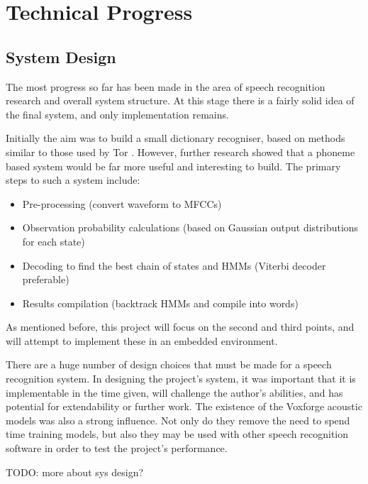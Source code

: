 \chapter{Technical Progress} %
\label{cha:technical_progress}


\section{System Design} %
\label{sec:system_design}
The most progress so far has been made in the area of speech recognition research and overall system structure.  At this stage there is a fairly solid idea of the final system, and only implementation remains.

Initially the aim was to build a small dictionary recogniser, based on methods similar to those used by Tor \cite{tor2003}.  However, further research showed that a phoneme based system would be far more useful and interesting to build.  The primary steps to such a system include:
\begin{itemize}
	\item Pre-processing (convert waveform to MFCCs)
	\item Observation probability calculations (based on Gaussian output distributions for each state)
	\item Decoding to find the best chain of states and HMMs (Viterbi decoder preferable)
	\item Results compilation (backtrack HMMs and compile into words)
\end{itemize}

As mentioned before, this project will focus on the second and third points, and will attempt to implement these in an embedded environment.

There are a huge number of design choices that must be made for a speech recognition system.  In designing the project's system, it was important that it is implementable in the time given, will challenge the author's abilities, and has potential for extendability or further work.  The existence of the Voxforge acoustic models was also a strong influence.  Not only do they remove the need to spend time training models, but also they may be used with other speech recognition software in order to test the project's performance.

TODO: more about sys design?


